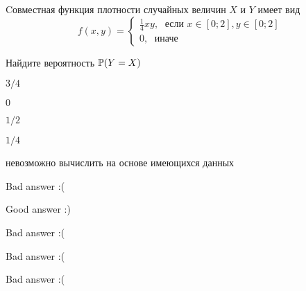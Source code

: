 
\begin{question}
Cовместная функция плотности случайных величин \(X\) и \(Y\) имеет вид
\[
f(x,y)=\begin{cases}
\frac{1}{4}xy, \; \text{ если } x\in[0;2], y\in [0;2] \\
0, \; \text{ иначе}
\end{cases}
\]

Найдите вероятность \(\P(Y = X)\)
\begin{answerlist}
  \item \(3/4\)
  \item \(0\)
  \item \(1/2\)
  \item \(1/4\)
  \item невозможно вычислить на основе имеющихся данных
\end{answerlist}
\end{question}

\begin{solution}
\begin{answerlist}
  \item Bad answer :(
  \item Good answer :)
  \item Bad answer :(
  \item Bad answer :(
  \item Bad answer :(
\end{answerlist}
\end{solution}

